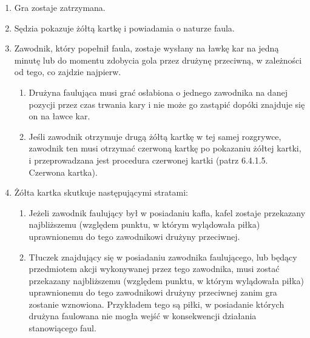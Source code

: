 \documentclass[12pt]{article}
\begin{document}
\begin{enumerate}
	\item
	      Gra zostaje zatrzymana.
	\item
	      Sędzia pokazuje żółtą kartkę i powiadamia o naturze faula.
	\item
	      Zawodnik, który popełnił faula, zostaje wysłany na ławkę kar na jedną
	      minutę lub do momentu zdobycia gola przez drużynę przeciwną, w
	      zależności od tego, co zajdzie najpierw.

	      \begin{enumerate}
		      \item
		            Drużyna faulująca musi grać osłabiona o jednego zawodnika na danej
		            pozycji przez czas trwania kary i nie może go zastąpić dopóki
		            znajduje się on na ławce kar.
		      \item
		            Jeśli zawodnik otrzymuje drugą żółtą kartkę w tej samej rozgrywce,
		            zawodnik ten musi otrzymać czerwoną kartkę po pokazaniu żółtej
		            kartki, i przeprowadzana jest procedura czerwonej kartki (patrz
		            6.4.1.5. Czerwona kartka).
	      \end{enumerate}
	\item
	      Żółta kartka skutkuje następującymi stratami:

	      \begin{enumerate}
		      \item
		            Jeżeli zawodnik faulujący był w posiadaniu kafla, kafel zostaje
		            przekazany najbliższemu (względem punktu, w którym wylądowała piłka)
		            uprawnionemu do tego zawodnikowi drużyny przeciwnej.
		      \item
		            Tłuczek znajdujący się w posiadaniu zawodnika faulującego, lub
		            będący przedmiotem akcji wykonywanej przez tego zawodnika, musi
		            zostać przekazany najbliższemu (względem punktu, w którym wylądowała
		            piłka) uprawnionemu do tego zawodnikowi drużyny przeciwnej zanim gra
		            zostanie wznowiona. Przykładem tego są piłki, w posiadanie których
		            drużyna faulowana nie mogła wejść w konsekwencji działania
		            stanowiącego faul.


\end{enumerate}
\end{enumerate}
\end{document}
